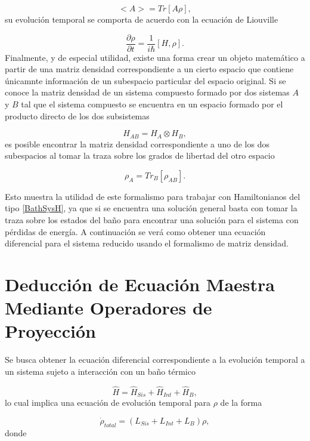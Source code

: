 \documentclass[a4paper,10pt]{report}
\begin{document}
\begin{equation}
<A> = Tr[A\rho],
\end{equation} su evolución temporal se comporta de acuerdo con la ecuación de Liouville

\begin{equation}
\dfrac{\partial \rho}{\partial t} = \frac{1}{i\hbar}[H,\rho].
\end{equation} Finalmente, y de especial utilidad, existe una forma crear un objeto matemático a partir de una matriz densidad correspondiente a un cierto espacio que contiene únicamnte información de un subespacio particular del espacio original. Si se conoce la matriz densidad de un sistema compuesto formado por dos sistemas $A$ y $B$ tal que el sistema compuesto se encuentra en un espacio formado por el producto directo de los dos subsistemas

\begin{equation}
H_{AB} = H_A \otimes H_B,
\end{equation} es posible encontrar la matriz densidad correspondiente a uno de los dos subespacios al tomar la traza sobre los grados de libertad del otro espacio

\begin{equation}
\rho_A = Tr_B [\rho_{AB}].
\end{equation}

Esto muestra la utilidad de este formalismo para trabajar con Hamiltonianos del tipo \eqref{BathSysH}, ya que si se encuentra una solución general basta con tomar la traza sobre los estados del baño para encontrar una solución para el sistema con pérdidas de energía. A continuación se verá como obtener una ecuación diferencial para el sistema reducido usando el formalismo de matriz densidad.

\section{Deducción de Ecuación Maestra Mediante Operadores de Proyección}

Se busca obtener la ecuación diferencial correspondiente a la evolución temporal a un sistema sujeto a interacción con un baño térmico

\begin{equation}
\hat{H} = \hat{H}_{Sis}+\hat{H}_{Int}+\hat{H}_B,
\end{equation} lo cual implica una ecuación de evolución temporal para $\rho$ de la forma

\begin{equation}\label{LMeq}
\dot{\rho}_{total} = (L_{Sis}+L_{Int}+L_B)\rho,
\end{equation}donde
\end{document}
